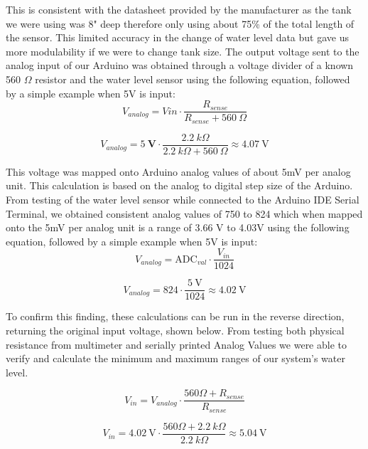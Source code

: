 \documentclass[../main.tex]{subfiles}
\begin{document}
This is consistent with the datasheet provided by the manufacturer as the tank we were using was 8" deep therefore only using about 75\% of the total length of the sensor. This limited accuracy in the change of water level data but gave us more modulability if we were to change tank size. The output voltage sent to the analog input of our Arduino was obtained through a voltage divider of a known 560 $\Omega$ resistor and the water level sensor using the following equation, followed by a simple example when 5V is input:
\begin{equation}
V_{analog} = V{in}\cdot\frac{R_{sense}}{R_{sense}+560~\Omega}
\end{equation}

\begin{equation}
V_{analog} = 5~\textbf{V}\cdot\frac{2.2~k\Omega}{2.2~k\Omega+560~\Omega}\approx 4.07~\text{V}
\end{equation}

This voltage was mapped onto Arduino analog values of about 5mV per analog unit. This calculation is based on the analog to digital step size of the Arduino. From testing of the water level sensor while connected to the Arduino IDE Serial Terminal, we obtained consistent analog values of 750 to 824 which when mapped onto the 5mV per analog unit is a range of 3.66 V to 4.03V using the following equation, followed by a simple example when 5V is input:
\begin{equation}
V_{analog} = \text{ADC}_{val}\cdot\frac{V_{in}}{1024}
\end{equation}

\begin{equation}
V_{analog} = 824\cdot\frac{5~\text{V}}{1024}\approx 4.02~\text{V}
\end{equation}

To confirm this finding, these calculations can be run in the reverse direction, returning the original input voltage, shown below. From testing both physical resistance from multimeter and serially printed Analog Values we were able to verify and calculate the minimum and maximum ranges of our system’s water level.

\begin{equation}
V_{in}=V_{analog}\cdot\frac{560\Omega+R_{sense}}{R_{sense}}
\end{equation}

\begin{equation}
V_{in}=4.02~\text{V}\cdot\frac{560\Omega+2.2~k\Omega}{2.2~k\Omega}\approx5.04~\text{V}
\end{equation}
\end{document}
